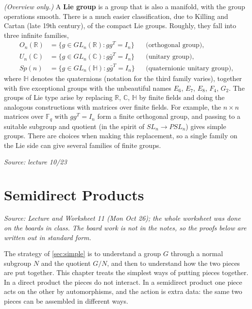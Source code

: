 \documentclass[11pt]{report}
\newcommand{\srcline}[1]{\par\hfill{\footnotesize\textit{Source: #1}}}
\begin{document}
\begin{rembox}\label{rem:lie-type-origin}
\textit{(Overview only.)} A \textbf{Lie group} is a group that is also a manifold, with the group operations smooth. There is a much easier classification, due to Killing and Cartan (late 19th century), of the compact Lie groups. Roughly, they fall into three infinite families,
\begin{align*}
O_n(\mathbb{R}) &= \{ g \in GL_n(\mathbb{R}) : g g^{T} = I_n \} && \text{(orthogonal group)}, \\
U_n(\mathbb{C}) &= \{ g \in GL_n(\mathbb{C}) : g \bar{g}^{T} = I_n \} && \text{(unitary group)}, \\
Sp(n) &= \{ g \in GL_n(\mathbb{H}) : g \bar{g}^{T} = I_n \} && \text{(quaternionic unitary group)},
\end{align*}
where $\mathbb{H}$ denotes the quaternions (notation for the third family varies), together with five exceptional groups with the unbeautiful names $E_6$, $E_7$, $E_8$, $F_4$, $G_2$. The groups of Lie type arise by replacing $\mathbb{R}$, $\mathbb{C}$, $\mathbb{H}$ by finite fields and doing the analogous constructions with matrices over finite fields. For example, the $n \times n$ matrices over $\mathbb{F}_q$ with $gg^{T} = I_n$ form a finite orthogonal group, and passing to a suitable subgroup and quotient (in the spirit of $SL_n \to PSL_n$) gives simple groups. There are choices when making this replacement, so a single family on the Lie side can give several families of finite groups.
\srcline{lecture 10/23}
\end{rembox}


\chapter{Semidirect Products}\label{ch:semidirect}

\textit{Source: Lecture and Worksheet 11 (Mon Oct 26); the whole worksheet was done on the boards in class. The board work is not in the notes, so the proofs below are written out in standard form.}

The strategy of \ref{sec:simple} is to understand a group $G$ through a normal subgroup $N$ and the quotient $G/N$, and then to understand how the two pieces are put together. This chapter treats the simplest ways of putting pieces together. In a direct product the pieces do not interact. In a semidirect product one piece acts on the other by automorphisms, and the action is extra data: the same two pieces can be assembled in different ways.
\end{document}
